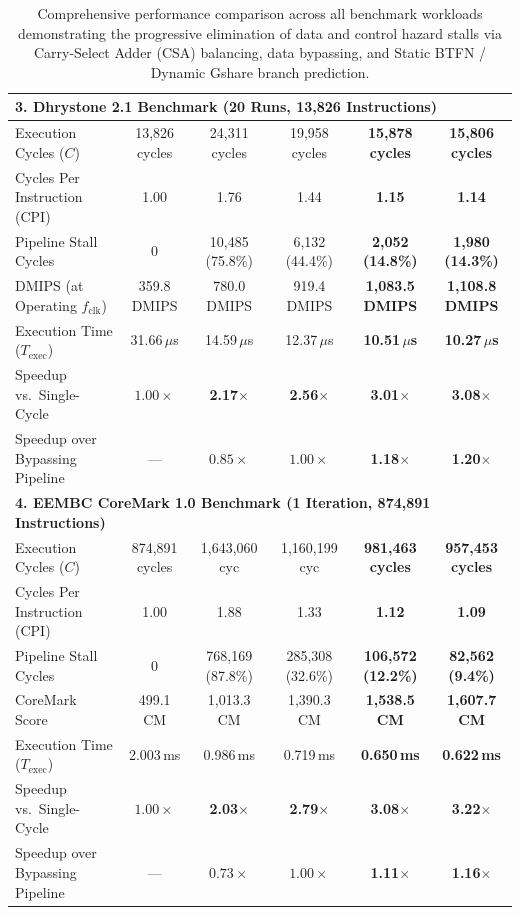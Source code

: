 \begin{table}[htbp]
{\begin{tabular}{|l|c|c|c|c|c|}
\hline
\multicolumn{6}{|l|}{\textbf{3. Dhrystone 2.1 Benchmark (20 Runs, 13,826 Instructions)}} \\
\hline
Execution Cycles ($C$)          & 13,826 cycles & 24,311 cycles & 19,958 cycles & \textbf{15,878 cycles} & \textbf{15,806 cycles} \\
Cycles Per Instruction (CPI)    & 1.00          & 1.76          & 1.44          & \textbf{1.15}          & \textbf{1.14} \\
Pipeline Stall Cycles           & 0             & 10,485 (75.8\%)& 6,132 (44.4\%)& \textbf{2,052 (14.8\%)}& \textbf{1,980 (14.3\%)} \\
DMIPS (at Operating $f_{\text{clk}}$)& 359.8 DMIPS& 780.0 DMIPS  & 919.4 DMIPS   & \textbf{1,083.5 DMIPS} & \textbf{1,108.8 DMIPS} \\
Execution Time ($T_{\text{exec}}$)& 31.66\,$\mu$s & 14.59\,$\mu$s & 12.37\,$\mu$s & \textbf{10.51\,$\mu$s} & \textbf{10.27\,$\mu$s} \\
Speedup vs.\ Single-Cycle       & $1.00\times$  & \textbf{2.17$\times$} & \textbf{2.56$\times$} & \textbf{3.01$\times$}  & \textbf{3.08$\times$} \\
Speedup over Bypassing Pipeline & ---           & $0.85\times$  & $1.00\times$  & \textbf{1.18$\times$}  & \textbf{1.20$\times$} \\
\hline
\multicolumn{6}{|l|}{\textbf{4. EEMBC CoreMark 1.0 Benchmark (1 Iteration, 874,891 Instructions)}} \\
\hline
Execution Cycles ($C$)          & 874,891 cycles& 1,643,060 cyc & 1,160,199 cyc & \textbf{981,463 cycles}& \textbf{957,453 cycles} \\
Cycles Per Instruction (CPI)    & 1.00          & 1.88          & 1.33          & \textbf{1.12}          & \textbf{1.09} \\
Pipeline Stall Cycles           & 0             & 768,169 (87.8\%)& 285,308 (32.6\%)& \textbf{106,572 (12.2\%)}& \textbf{82,562 (9.4\%)} \\
CoreMark Score                  & 499.1 CM      & 1,013.3 CM    & 1,390.3 CM    & \textbf{1,538.5 CM}    & \textbf{1,607.7 CM} \\
Execution Time ($T_{\text{exec}}$)& 2.003\,ms   & 0.986\,ms     & 0.719\,ms     & \textbf{0.650\,ms}     & \textbf{0.622\,ms} \\
Speedup vs.\ Single-Cycle       & $1.00\times$  & \textbf{2.03$\times$} & \textbf{2.79$\times$} & \textbf{3.08$\times$}  & \textbf{3.22$\times$} \\
Speedup over Bypassing Pipeline & ---           & $0.73\times$  & $1.00\times$  & \textbf{1.11$\times$}  & \textbf{1.16$\times$} \\
\hline
\end{tabular}%
}
\caption{Comprehensive performance comparison across all benchmark workloads demonstrating the progressive elimination of data and control hazard stalls via Carry-Select Adder (CSA) balancing, data bypassing, and Static BTFN / Dynamic Gshare branch prediction.}\label{tab:riscv_bp_benchmark_grand_summary}
\end{table}

